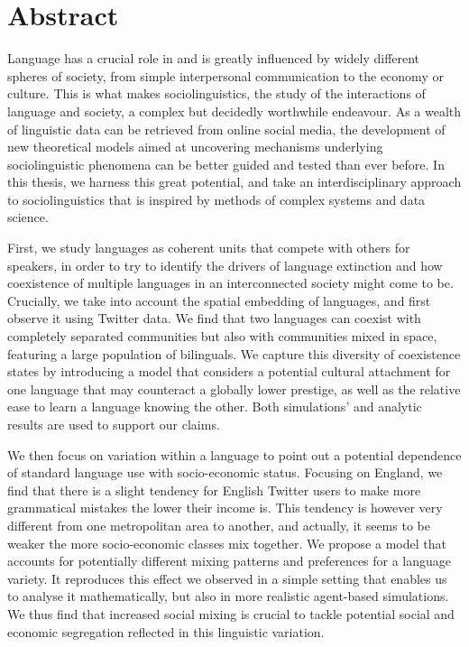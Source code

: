 \documentclass[../thesis.tex]{subfiles}
\begin{document}
\begingroup
\let\cleardoublepage\relax
\let\cleardoublepage\relax

\chapter*{Abstract}
Language has a crucial role in and is greatly influenced by widely different spheres of
society, from simple interpersonal communication to the economy or culture. This is
what makes sociolinguistics, the study of the interactions of language and society, a
complex but decidedly worthwhile endeavour. As a wealth of linguistic data can be
retrieved from online social media, the development of new theoretical models aimed at
uncovering mechanisms underlying sociolinguistic phenomena can be better guided and
tested than ever before. In this thesis, we harness this great potential, and take an
interdisciplinary approach to sociolinguistics that is inspired by methods of complex
systems and data science.

First, we study languages as coherent units that compete with others for speakers, in
order to try to identify the drivers of language extinction and how coexistence of multiple
languages in an interconnected society might come to be. Crucially, we take into account
the spatial embedding of languages, and first observe it using Twitter data. We find
that two languages can coexist with completely separated communities but also with
communities mixed in space, featuring a large population of bilinguals. We capture this
diversity of coexistence states by introducing a model that considers a potential
cultural attachment for one language that may counteract a globally lower prestige, as
well as the relative ease to learn a language knowing the other. Both simulations' and
analytic results are used to support our claims.

We then focus on variation within a language to point out a potential dependence of
standard language use with socio-economic status. Focusing on England, we find that
there is a slight tendency for English Twitter users to make more grammatical mistakes
the lower their income is. This tendency is however very different from one metropolitan
area to another, and actually, it seems to be weaker the more socio-economic classes mix
together. We propose a model that accounts for potentially different mixing patterns and
preferences for a language variety. It reproduces this effect we observed in a simple
setting that enables us to analyse it mathematically, but also in more realistic
agent-based simulations.
We thus find that increased social mixing is crucial to tackle potential social and
economic segregation reflected in this linguistic variation.
\end{document}

